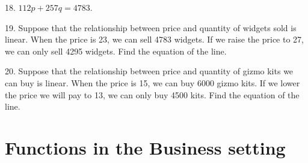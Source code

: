 \documentclass[10pt,]{book}
\theoremstyle{plain}
\theoremstyle{definition}
\theoremstyle{definition}
\begin{document}
\begin{exerciselist}
\item[18.]\hypertarget{exercise-18}{}
 \(112 p+257 q=4783\).
%
\par\smallskip
\item[19.]\hypertarget{exercise-19}{}
 Suppose that the relationship between price and quantity of widgets sold is linear.  When the price is \textdollar{}23, we can sell 4783 widgets.  If we raise the price to \textdollar{}27, we can only sell 4295 widgets.  Find the equation of the line.
%
\par\smallskip
\item[20.]\hypertarget{exercise-20}{}
 Suppose that the relationship between price and quantity of gizmo kits we can buy is linear.  When the price is \textdollar{}15, we can buy 6000 gizmo kits.  If we lower the price we will pay to \textdollar{}13, we can only buy 4500 kits.  Find the equation of the line.
%
\par\smallskip
\end{exerciselist}
\typeout{************************************************}
\typeout{************************************************}
\section[{Functions in the Business setting}]{Functions in the Business setting}\label{sec-1-2-FunctionsBusinessSetting}
\end{document}
